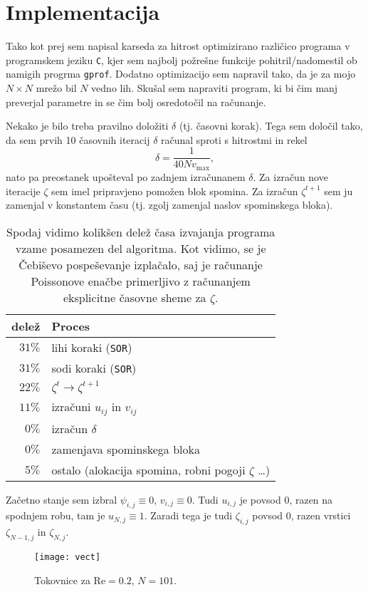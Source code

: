 \documentclass[a4 paper, 12pt]{article}
\renewcommand{\Re}{
    \ensuremath{\mathrm{Re}}
}
\begin{document}
\section{Implementacija}

Tako kot prej sem napisal karseda za hitrost optimizirano razli\v cico programa v programskem jeziku
{\tt C}, kjer sem najbolj po\v zre\v sne funkcije pohitril/nadomestil ob namigih progrma {\tt gprof}.
Dodatno optimizacijo sem napravil tako, da je za mojo $N \times N$ mre\v zo bil $N$ vedno lih. Sku\v sal sem
napraviti program, ki bi \v cim manj preverjal parametre in se \v cim bolj osredoto\v cil na ra\v cunanje.

Nekako je bilo treba pravilno dolo\v ziti $\delta$ (tj. \v casovni korak). Tega sem dolo\v cil tako, da sem
prvih 10 \v casovnih iteracij $\delta$ ra\v cunal sproti s hitrostmi in rekel
\[
    \delta = \frac{1}{40 N v_\text{max}},
\]
nato pa preostanek upo\v steval po zadnjem izra\v cunanem $\delta$. Za izra\v cun nove iteracije $\zeta$ sem
imel pripravjeno pomo\v zen blok spomina. Za izra\v cun $\zeta^{t+1}$ sem ju zamenjal v konstantem \v casu
(tj. zgolj zamenjal naslov spominskega bloka).

\begin{table}[H]\centering
    \caption{Spodaj vidimo kolik\v sen dele\v z \v casa izvajanja programa vzame posamezen del algoritma.
    Kot vidimo, se je \v Cebi\v sevo pospe\v sevanje izpla\v calo, saj je ra\v cunanje Poissonove ena\v cbe
    primerljivo z ra\v cunanjem eksplicitne \v casovne sheme za $\zeta$.}
    \begin{tabular}{r|l}
        dele\v z & Proces \\
        \hline
        $31 \%$ & lihi koraki ({\tt SOR}) \\
        $31 \%$ & sodi koraki ({\tt SOR}) \\
        $22 \%$ & $\zeta^{t} \to \zeta^{t+1}$ \\
        $11 \%$ & izra\v cuni $u_{ij}$ in $v_{ij}$ \\
        $0 \%$  & izra\v cun $\delta$ \\
        $0 \%$  & zamenjava spominskega bloka \\
        \hline
        $5 \%$  & ostalo (alokacija spomina, robni pogoji $\zeta$ \ldots)
    \end{tabular}
\end{table}

Za\v cetno stanje sem izbral $\psi_{i,j} \equiv 0$, $v_{i,j} \equiv 0$. Tudi $u_{i,j}$ je povsod 0, razen na
spodnjem robu, tam je $u_{N,j} \equiv 1$. Zaradi tega je tudi $\zeta_{i,j}$ povsod 0, razen vrstici 
$\zeta_{N-1,j}$ in $\zeta_{N,j}$.

\begin{figure}[H]\centering
    \texttt{[image: vect]}
    \caption{Tokovnice za $\Re = 0.2$, $N = 101$.}
    \label{gr1}
\end{figure}
\end{document}

